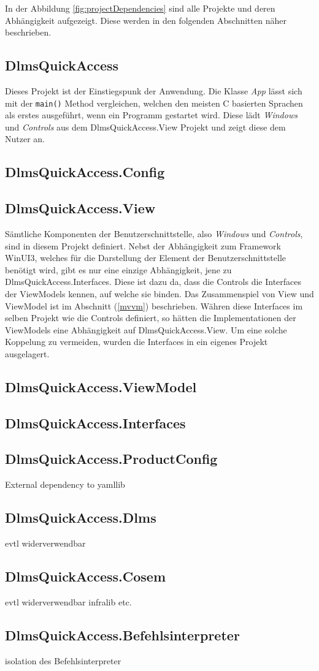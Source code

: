 In der Abbildung \ref{fig:projectDependencies} sind alle Projekte und deren Abhängigkeit aufgezeigt.
Diese werden in den folgenden Abschnitten näher beschrieben.

\subsection{DlmsQuickAccess}
Dieses Projekt ist der Einstiegspunk der Anwendung.
Die Klasse \textit{App} lässt sich mit der \texttt{main()} Method vergleichen, welchen den meisten C basierten Sprachen als erstes ausgeführt, wenn ein Programm gestartet wird.
Diese lädt \textit{Windows} und \textit{Controls} aus dem DlmsQuickAccess.View Projekt und zeigt diese dem Nutzer an.


\subsection{DlmsQuickAccess.Config}

\subsection{DlmsQuickAccess.View}
Sämtliche Komponenten der Benutzerschnittstelle, also \textit{Windows} und \textit{Controls}, sind in diesem Projekt definiert. 
Nebst der Abhängigkeit zum Framework WinUI3, welches für die Darstellung der Element der Benutzerschnittstelle benötigt wird, gibt es nur eine einzige Abhängigkeit, jene zu DlmsQuickAccess.Interfaces.
Diese ist dazu da, dass die Controls die Interfaces der ViewModels kennen, auf welche sie binden.
Das Zusammenspiel von View und ViewModel ist im Abschnitt (\ref{mvvm}) beschrieben.
Währen diese Interfaces im selben Projekt wie die Controls definiert, so hätten die Implementationen der ViewModels eine Abhängigkeit auf DlmsQuickAccess.View.
Um eine solche Koppelung zu vermeiden, wurden die Interfaces in ein eigenes Projekt ausgelagert.


\subsection{DlmsQuickAccess.ViewModel}



\subsection{DlmsQuickAccess.Interfaces}

\subsection{DlmsQuickAccess.ProductConfig}
External dependency to yamllib


\subsection{DlmsQuickAccess.Dlms}
evtl widerverwendbar

\subsection{DlmsQuickAccess.Cosem}
evtl widerverwendbar
infralib etc.

\subsection{DlmsQuickAccess.Befehlsinterpreter}
isolation des Befehlsinterpreter



